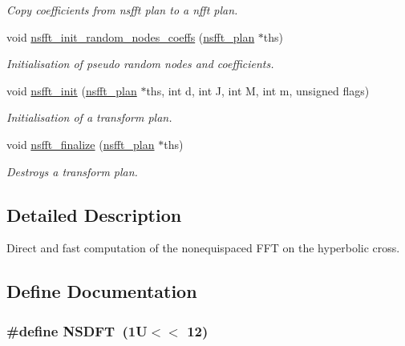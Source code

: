 \begin{CompactItemize}
\begin{CompactList}\small\item\em Copy coefficients from nsfft plan to a nfft plan. \item\end{CompactList}\item 
void \hyperlink{group__nsfft_g7cbc20c44eeecadc5c30f4159616f30a}{nsfft\_\-init\_\-random\_\-nodes\_\-coeffs} (\hyperlink{structnsfft__plan}{nsfft\_\-plan} $\ast$ths)
\begin{CompactList}\small\item\em Initialisation of pseudo random nodes and coefficients. \item\end{CompactList}\item 
void \hyperlink{group__nsfft_g1b7f87f960cb22420a933e915c539aaf}{nsfft\_\-init} (\hyperlink{structnsfft__plan}{nsfft\_\-plan} $\ast$ths, int d, int J, int M, int m, unsigned flags)
\begin{CompactList}\small\item\em Initialisation of a transform plan. \item\end{CompactList}\item 
void \hyperlink{group__nsfft_gef170ad12eff8fde1c78bc6071142b36}{nsfft\_\-finalize} (\hyperlink{structnsfft__plan}{nsfft\_\-plan} $\ast$ths)
\begin{CompactList}\small\item\em Destroys a transform plan. \item\end{CompactList}\end{CompactItemize}


\subsection{Detailed Description}
Direct and fast computation of the nonequispaced FFT on the hyperbolic cross. 

\subsection{Define Documentation}
\hypertarget{group__nsfft_g3a5a1f8be42adf0575f0e0c4b8e0a32a}{
\subsubsection{\setlength{\rightskip}{0pt plus 5cm}\#define NSDFT~(1U$<$$<$ 12)}}
\label{group__nsfft_g3a5a1f8be42adf0575f0e0c4b8e0a32a}


